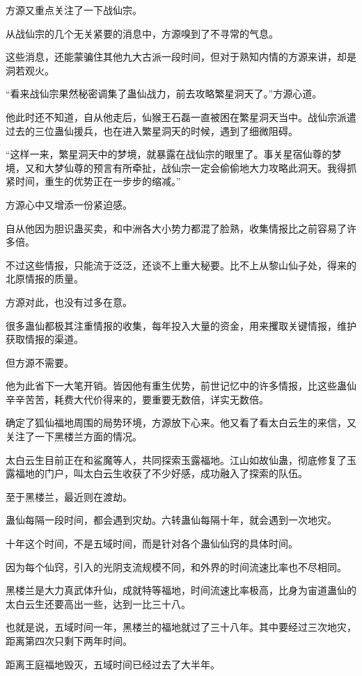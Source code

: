 \begin{this_body}
方源又重点关注了一下战仙宗。

从战仙宗的几个无关紧要的消息中，方源嗅到了不寻常的气息。

这些消息，还能蒙骗住其他九大古派一段时间，但对于熟知内情的方源来讲，却是洞若观火。

“看来战仙宗果然秘密调集了蛊仙战力，前去攻略繁星洞天了。”方源心道。

他此时还不知道，自从他走后，仙猴王石磊一直被困在繁星洞天当中。战仙宗派遣过去的三位蛊仙援兵，也在进入繁星洞天的时候，遇到了细微阻碍。

“这样一来，繁星洞天中的梦境，就暴露在战仙宗的眼里了。事关星宿仙尊的梦境，又和大梦仙尊的预言有所牵扯，战仙宗一定会偷偷地大力攻略此洞天。我得抓紧时间，重生的优势正在一步步的缩减。”

方源心中又增添一份紧迫感。

自从他因为胆识蛊买卖，和中洲各大小势力都混了脸熟，收集情报比之前容易了许多倍。

不过这些情报，只能流于泛泛，还谈不上重大秘要。比不上从黎山仙子处，得来的北原情报的质量。

方源对此，也没有过多在意。

很多蛊仙都极其注重情报的收集，每年投入大量的资金，用来攫取关键情报，维护获取情报的渠道。

但方源不需要。

他为此省下一大笔开销。皆因他有重生优势，前世记忆中的许多情报，比这些蛊仙辛辛苦苦，耗费大代价得来的，要重要无数倍，详实无数倍。

确定了狐仙福地周围的局势环境，方源放下心来。他又看了看太白云生的来信，又关注了一下黑楼兰方面的情况。

太白云生目前正在和鲨魔等人，共同探索玉露福地。江山如故仙蛊，彻底修复了玉露福地的门户，叫太白云生收获了不少好感，成功融入了探索的队伍。

至于黑楼兰，最近则在渡劫。

蛊仙每隔一段时间，都会遇到灾劫。六转蛊仙每隔十年，就会遇到一次地灾。

十年这个时间，不是五域时间，而是针对各个蛊仙仙窍的具体时间。

因为每个仙窍，引入的光阴支流规模不同，和外界的时间流速比率也不尽相同。

黑楼兰是大力真武体升仙，成就特等福地，时间流速比率极高，比身为宙道蛊仙的太白云生还要高出一些，达到一比三十八。

也就是说，五域时间一年，黑楼兰的福地就过了三十八年。其中要经过三次地灾，距离第四次只剩下两年时间。

距离王庭福地毁灭，五域时间已经过去了大半年。


\end{this_body}
